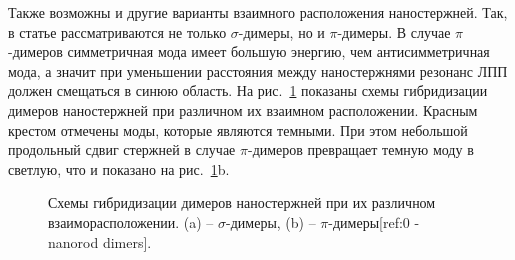 Также возможны и другие варианты взаимного расположения наностержней. Так, в статье \cite{nanorods1} рассматриваются не только $ \sigma$-димеры, но и $ \pi$-димеры. В случае $ \pi$-димеров симметричная мода имеет большую энергию, чем антисимметричная мода, а значит при уменьшении расстояния между наностержнями резонанс ЛПП должен смещаться в синюю область. На рис.~\ref{img:dimer_resonances} показаны схемы гибридизации димеров наностержней при различном их взаимном расположении. Красным крестом отмечены моды, которые являются темными. При этом небольшой продольный сдвиг стержней в случае $ \pi$-димеров превращает темную моду в светлую, что и показано на рис.~\ref{img:dimer_resonances}b. 

\begin{figure}[t]
\caption{Схемы гибридизации димеров наностержней при их различном взаиморасположении. (a) -- $ \sigma$-димеры, (b) -- $ \pi $-димеры[ref:0 - nanorod dimers].}
\label{img:dimer_resonances}
\end{figure}

